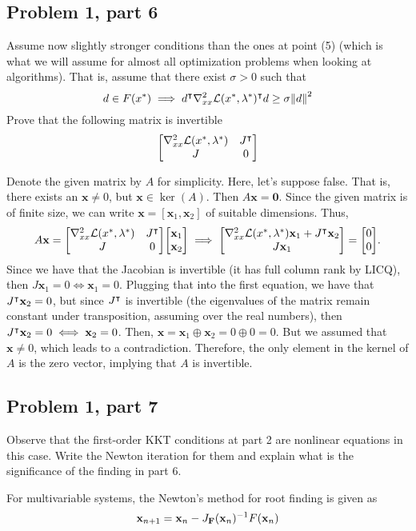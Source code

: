\subsection{Problem 1, part 6}
Assume now slightly stronger conditions than the ones at point (5) (which is what we will assume for almost all optimization problems when looking at algorithms). That is, assume that there exist $\sigma > 0$ such that
\[d \in F(x^{*}) \implies d^{\intercal} \nabla^2_{xx}\mathcal{L}(x^{*}, \mathrm{\lambda}^{*})^{\intercal} d \geq \sigma\norm{d}^2\]
Prove that the following matrix is invertible
\[\mqty[\grad^2_{xx}\scL(x\star, \lm\star) &J\T\\ J&0]\]
\partbreak
\begin{solution}

    Denote the given matrix by $A$ for simplicity. Here, let's suppose false. That is, there exists an $\textbf{x} \neq 0$, but $\textbf{x} \in \ker (A)$. Then $A\textbf{x} = \textbf{0}$. Since the given matrix is of finite size, we can write $\textbf{x} = [\textbf{x}_1, \textbf{x}_2]$ of suitable dimensions. Thus, 
    \[A\textbf{x} = \mqty[\grad^2_{xx}\scL(x\star, \lm\star) &J\T\\ J&0]\mqty[\textbf{x}_1\\\textbf{x}_2] \implies \mqty[\grad^2_{xx}\scL(x\star, \lm\star)\textbf{x}_1 + J\T \textbf{x}_2\\ J\textbf{x}_1] = \mqty[0\\0].\]
    Since we have that the Jacobian is invertible (it has full column rank by LICQ), then $J\textbf{x}_1 = 0 \iff \textbf{x}_1 = 0$. Plugging that into the first equation, we have that $J^{\intercal} \textbf{x}_2 = 0$, but since $J^{\intercal}$ is invertible (the eigenvalues of the matrix remain constant under transposition, assuming over the real numbers), then $J^{\intercal} \textbf{x}_2 = 0 \iff \textbf{x}_2 = 0$. Then, $\textbf{x} = \textbf{x}_1 \oplus \textbf{x}_2 = 0 \oplus 0 = 0$. But we assumed that $\textbf{x} \neq 0$, which leads to a contradiction. Therefore, the only element in the kernel of $A$ is the zero vector, implying that $A$ is invertible.  
\end{solution}

\newpage
\subsection{Problem 1, part 7}
Observe that the first-order KKT conditions at part 2 are nonlinear equations in this case. Write the Newton iteration for them and explain what is the significance of the finding in part 6. 
\partbreak
\begin{solution}

    For multivariable systems, the Newton's method for root finding is given as 
    \[\textbf{x}_{n+1} = \textbf{x}_n - J_\textbf{F}(\textbf{x}_n)^{-1} F(\textbf{x}_n)\]
\end{solution}

